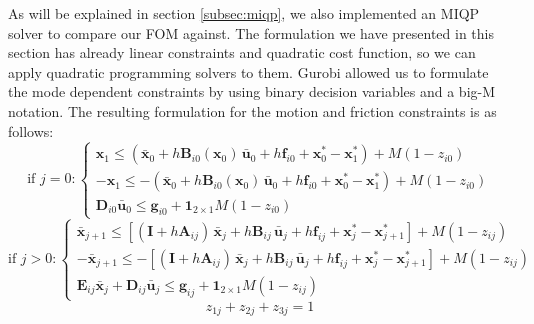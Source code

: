 \documentclass[12,twoside]{TFG-GM}
\theoremstyle{definition}
\theoremstyle{remark}
\newcommand*\diff[1]{\bar{#1}}
\begin{document}
As will be explained in section \ref{subsec:miqp}, we also implemented an MIQP solver to compare our FOM against. The formulation we have presented in this section has already linear constraints and quadratic cost function, so we can apply quadratic programming solvers to them. Gurobi allowed us to formulate the mode dependent constraints by using binary decision variables and a big-M notation. The resulting formulation for the motion and friction constraints is as follows: 
\begin{equation} \label{eq:big_m_first_step}
\text{if } j = 0: \begin{cases}

\textbf{x}_1 \leq (\diff{\textbf{x}}_0 +  h \textbf{B}_{i0}(\textbf{x}_0) \, \diff{\textbf{u}}_0 + h \textbf{f}_{i0} + \textbf{x}_0^* - \textbf{x}_1^*) + M (1 - z_{i0})\\

-\textbf{x}_1 \leq -(\diff{\textbf{x}}_0 +  h \textbf{B}_{i0}(\textbf{x}_0) \, \diff{\textbf{u}}_0 + h \textbf{f}_{i0} + \textbf{x}_0^* - \textbf{x}_1^*) + M (1 - z_{i0})\\

\textbf{D}_{i0} \diff{\textbf{u}}_0 \leq \textbf{g}_{i0} + \textbf{1}_{2\times1}M(1 - z_{i0})
\end{cases}
\end{equation}
\begin{equation} \label{eq:big_m_other_steps}
\text{if } j > 0: \begin{cases}

\diff{\textbf{x}}_{j+1} \leq [(\textbf{I} + h \textbf{A}_{ij})\, \diff{\textbf{x}}_j + h \textbf{B}_{ij} \, \diff{\textbf{u}}_j + h \textbf{f}_{ij}  + \textbf{x}_{j}^* - \textbf{x}_{j+1}^*] + M(1-z_{ij})\\

-\diff{\textbf{x}}_{j+1} \leq -[(\textbf{I} + h \textbf{A}_{ij})\, \diff{\textbf{x}}_j + h \textbf{B}_{ij} \, \diff{\textbf{u}}_j + h \textbf{f}_{ij}  + \textbf{x}_{j}^* - \textbf{x}_{j+1}^*] + M(1-z_{ij})\\

\textbf{E}_{ij} \diff{\textbf{x}}_j + \textbf{D}_{ij} \diff{\textbf{u}}_j \leq \textbf{g}_{ij} + \textbf{1}_{2\times1}M(1 - z_{ij})
\end{cases}
\end{equation}
\begin{equation} \label{eq:binary_const}
z_{1j} + z_{2j} + z_{3j} = 1
\end{equation}
\end{document}
